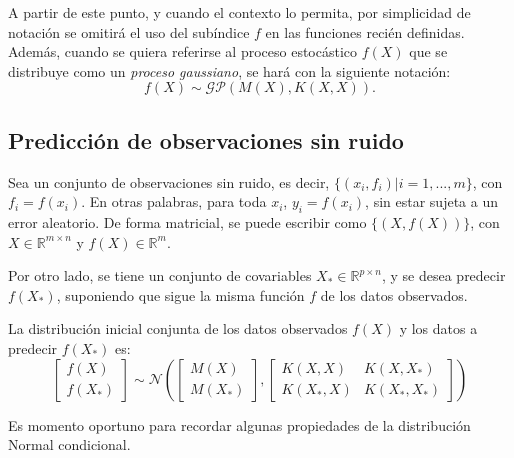 A partir de este punto, y cuando el contexto lo permita, por simplicidad de notaci\'on se omitirá el uso del subíndice $f$ en las funciones reci\'en definidas. Además, cuando se quiera referirse al proceso estoc\'astico $f(X)$ que se distribuye como un \textit{proceso gaussiano}, se har\'a con la siguiente notaci\'on:
\begin{equation*}
    f(X) \sim \mathcal{GP} (M(X),K(X,X)).
\end{equation*}

\subsection{Predicción de observaciones sin ruido}

Sea un conjunto de observaciones sin ruido, es decir, $\{(x_i,f_i)|i=1,...,m \}$, con $f_i=f(x_i)$. En otras palabras, para toda $x_i$, $y_i=f(x_i)$, sin estar sujeta a un error aleatorio. De forma matricial, se puede escribir como $\{(X,f(X))\}$, con $X \in \mathbb{R}^{m \times n}$ y $f(X) \in \mathbb{R}^{m}$. 

Por otro lado, se tiene un conjunto de covariables $X_* \in \mathbb{R}^{p \times n}$, y se desea predecir $f(X_*)$, suponiendo que sigue la misma función $f$ de los datos observados.

La distribución inicial conjunta de los datos observados $f(X)$ y los datos a predecir $f(X_*)$ es: 
\begin{equation*}
    \left[
        \begin{array}{c}
        f(X)  \\
        f(X_*) 
        \end{array}
    \right]  
    \sim \mathcal{N}  
    \left(
        \left[
            \begin{array}{c} 
            M(X) \\ 
            M(X_*) 
            \end{array}
        \right],
        \left[
            \begin{array}{cc}
            K(X,X) & K(X,X_*)  \\
            K(X_*,X) & K(X_*,X_*) 
            \end{array}
        \right]
    \right) 
\end{equation*}

Es momento oportuno para recordar algunas propiedades de la distribuci\'on Normal condicional. 

\newtheorem{prop}{Propiedad}

